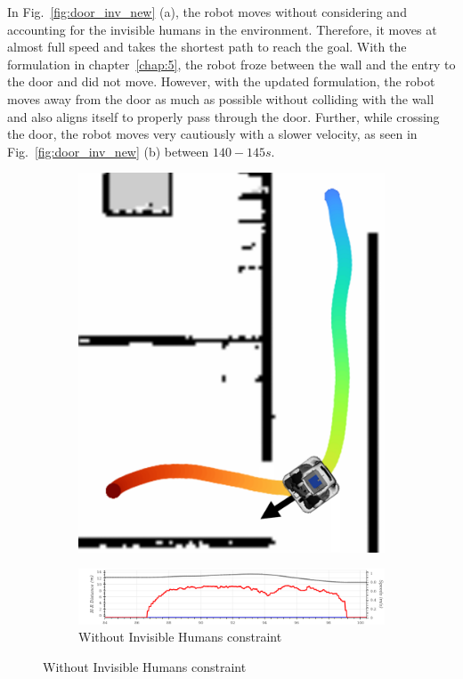 In Fig.~\ref{fig:door_inv_new} (a), the robot moves without considering and accounting for the invisible humans in the environment. Therefore, it moves at almost full speed and takes the shortest path to reach the goal. With the formulation in chapter~\ref{chap:5}, the robot froze between the wall and the entry to the door and did not move. However, with the updated formulation, the robot moves away from the door as much as possible without colliding with the wall and also aligns itself to properly pass through the door. Further, while crossing the door, the robot moves very cautiously with a slower velocity, as seen in Fig.~\ref{fig:door_inv_new} (b) between $140-145 s$.
\begin{figure}[!ht]
\centering
\begin{subfigure}{0.3\columnwidth}
  \includegraphics[width=\textwidth]{images/appendix/inv/without.png}
\end{subfigure}
\vspace{0.5cm}
\begin{subfigure}{0.8\columnwidth}
  \includegraphics[width=\textwidth]{images/appendix/inv/without2.png}
  \caption{Without Invisible Humans constraint}
\end{subfigure}


\end{figure}
